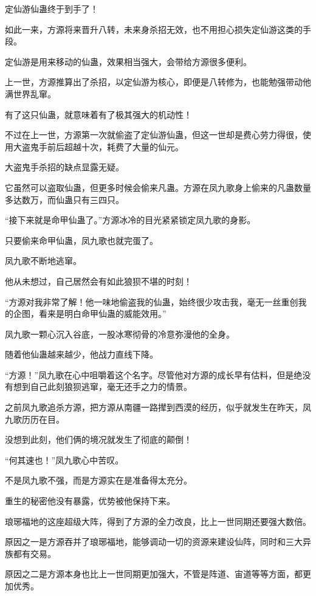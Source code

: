 
\begin{this_body}

定仙游仙蛊终于到手了！

如此一来，方源将来晋升八转，未来身杀招无效，也不用担心损失定仙游这类的手段。

定仙游是用来移动的仙蛊，效果相当强大，会带给方源很多便利。

上一世，方源推算出了杀招，以定仙游为核心，即便是八转修为，也能勉强带动他满世界乱窜。

有了这只仙蛊，就意味着有了极其强大的机动性！

不过在上一世，方源第一次就偷盗了定仙游仙蛊，但这一世却是费心劳力得很，使用大盗鬼手前后超越十次，耗费了大量的仙元。

大盗鬼手杀招的缺点显露无疑。

它虽然可以盗取仙蛊，但更多时候会偷来凡蛊。方源在凤九歌身上偷来的凡蛊数量多达数万，而仙蛊只有三四只。

“接下来就是命甲仙蛊了。”方源冰冷的目光紧紧锁定凤九歌的身影。

只要偷来命甲仙蛊，凤九歌也就完蛋了。

凤九歌不断地逃窜。

他从未想过，自己居然会有如此狼狈不堪的时刻！

“方源对我非常了解！他一味地偷盗我的仙蛊，始终很少攻击我，毫无一丝重创我的企图，看来是明白命甲仙蛊的威能效用。”

凤九歌一颗心沉入谷底，一股冰寒彻骨的冷意弥漫他的全身。

随着他仙蛊越来越少，他战力直线下降。

“方源！”凤九歌在心中咀嚼着这个名字。尽管他对方源的成长早有估料，但是绝没有想到自己此刻狼狈逃窜，毫无还手之力的情景。

之前凤九歌追杀方源，把方源从南疆一路撵到西漠的经历，似乎就发生在昨天，凤九歌历历在目。

没想到此刻，他们俩的境况就发生了彻底的颠倒！

“何其速也！”凤九歌心中苦叹。

不是凤九歌不强，而是方源实在是准备得太充分。

重生的秘密他没有暴露，优势被他保持下来。

琅琊福地的这座超级大阵，得到了方源的全力改良，比上一世同期还要强大数倍。

原因之一是方源吞并了琅琊福地，能够调动一切的资源来建设仙阵，同时和三大异族都有交易。

原因之二是方源本身也比上一世同期更加强大，不管是阵道、宙道等等方面，都更加优秀。


\end{this_body}
